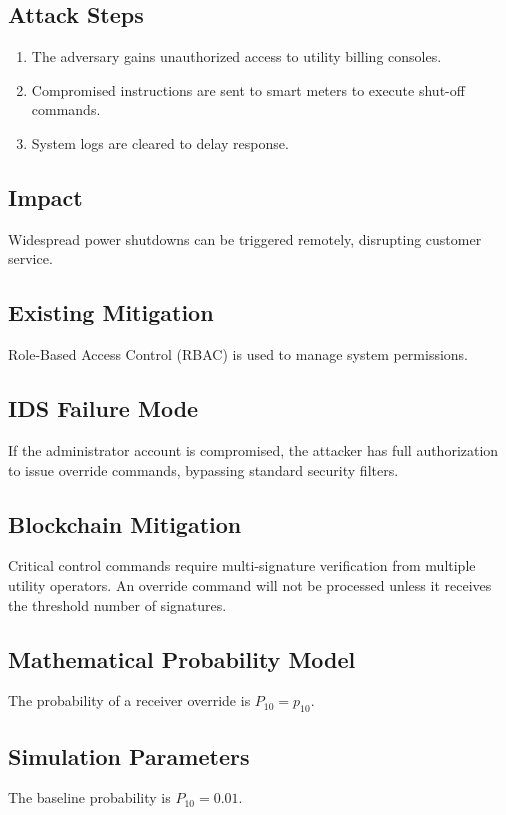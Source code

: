 \documentclass[12pt, oneside, a4paper]{report}
\theoremstyle{definition}
\theoremstyle{remark}
\begin{document}
\subsection{Attack Steps}
\begin{enumerate}
  \item The adversary gains unauthorized access to utility billing consoles.
  \item Compromised instructions are sent to smart meters to execute shut-off commands.
  \item System logs are cleared to delay response.
\end{enumerate}

\subsection{Impact}
Widespread power shutdowns can be triggered remotely, disrupting customer service.

\subsection{Existing Mitigation}
Role-Based Access Control (RBAC) is used to manage system permissions.

\subsection{IDS Failure Mode}
If the administrator account is compromised, the attacker has full authorization to issue override commands, bypassing standard security filters.

\subsection{Blockchain Mitigation}
Critical control commands require multi-signature verification from multiple utility operators. An override command will not be processed unless it receives the threshold number of signatures.

\subsection{Mathematical Probability Model}
The probability of a receiver override is $P_{10} = p_{10}$.

\subsection{Simulation Parameters}
The baseline probability is $P_{10} = 0.01$.
\end{document}
